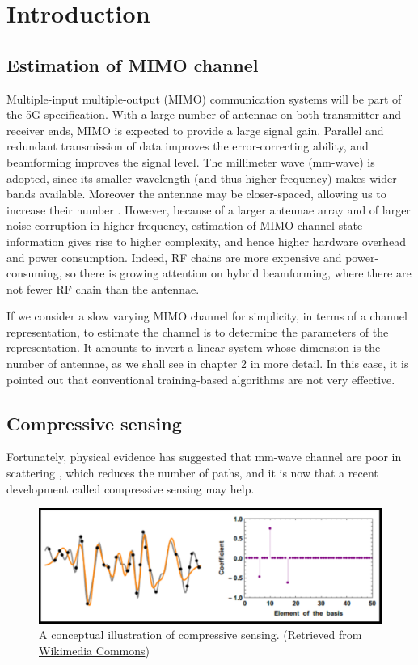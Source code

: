 \chapter {Introduction}

\section {Estimation of MIMO channel}

Multiple-input multiple-output (MIMO) communication systems will be part of the 5G specification.
With a large number of antennae on both transmitter and receiver ends, MIMO is expected to provide a large signal gain.
Parallel and redundant transmission of data improves the error-correcting ability, and beamforming improves the signal level.
The millimeter wave (mm-wave) is adopted, since its smaller wavelength (and thus higher frequency) makes wider bands available.
Moreover the antennae may be closer-spaced, allowing us to increase their number \cite {RSM13}.
However, because of a larger antennae array and of larger noise corruption in higher frequency, estimation of MIMO channel state information gives rise to higher complexity, and hence higher hardware overhead and power consumption.
Indeed, RF chains are more expensive and power-consuming, so there is growing attention on hybrid beamforming, where there are not fewer RF chain than the antennae.

If we consider a slow varying MIMO channel for simplicity, in terms of a channel representation, to estimate the channel is to determine the parameters of the representation.
It amounts to invert a linear system whose dimension is the number of antennae, as we shall see in chapter 2 in more detail.
In this case, it is pointed out that conventional training-based algorithms are not very effective.


\section {Compressive sensing}

Fortunately, physical evidence has suggested that mm-wave channel are poor in scattering \cite {ALS14}, which reduces the number of paths, and it is now that a recent development called compressive sensing may help.

\begin {figure} [hbt]
\centering
\includegraphics [width = \textwidth] {compressive-sensing.png}
\caption {
A conceptual illustration of compressive sensing.
(Retrieved from \href {commons.wikimedia.org/wiki/File:Orthogonal_Matching_Pursuit.gif} {Wikimedia Commons})
}
\end {figure}

